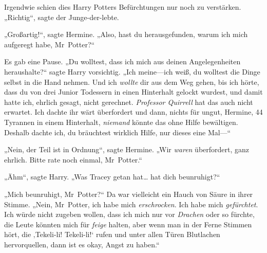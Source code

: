 Irgendwie schien dies Harry Potters Befürchtungen nur noch zu verstärken. „Richtig“, sagte der Junge-der-lebte.

„Großartig!“, sagte Hermine. „Also, hast du herausgefunden, warum ich mich aufgeregt habe, Mr~Potter?“

Es gab eine Pause. „Du wolltest, dass ich mich aus deinen Angelegenheiten heraushalte?“ sagte Harry vorsichtig. „Ich meine—ich weiß, du wolltest die Dinge selbst in die Hand nehmen. Und ich \emph{wollte} dir aus dem Weg gehen, bis ich hörte, dass du von drei Junior Todessern in einen Hinterhalt gelockt wurdest, und damit hatte ich, ehrlich gesagt, nicht gerechnet. \emph{Professor Quirrell} hat das auch nicht erwartet. Ich dachte ihr wärt überfordert und dann, nichts für ungut, Hermine, 44 Tyrannen in einem Hinterhalt, \emph{niemand} könnte das ohne Hilfe bewältigen. Deshalb dachte ich, du bräuchtest wirklich Hilfe, nur dieses eine Mal—“

„Nein, der Teil ist in Ordnung“, sagte Hermine. „Wir \emph{waren} überfordert, ganz ehrlich. Bitte rate noch einmal, Mr~Potter.“

„Ähm“, sagte Harry. „Was Tracey getan hat… hat dich beunruhigt?“

„Mich beunruhigt, Mr~Potter?“ Da war vielleicht ein Hauch von Säure in ihrer Stimme. „Nein, Mr~Potter, ich habe mich \emph{erschrocken}. Ich habe mich \emph{gefürchtet}. Ich würde nicht zugeben wollen, dass ich mich nur vor \emph{Drachen} oder so fürchte, die Leute könnten mich für \emph{feige} halten, aber wenn man in der Ferne Stimmen hört, die ‚Tekeli-li! Tekeli-li!‘ rufen und unter allen Türen Blutlachen hervorquellen, dann ist es okay, Angst zu haben.“

